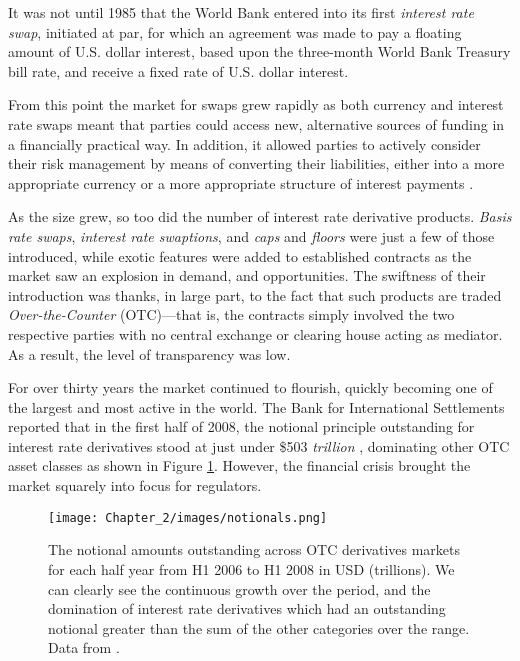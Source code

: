 It was not until 1985 that the World Bank entered into its first \textit{interest rate swap}, initiated at par, for which an agreement was made to pay a floating amount of U.S. dollar interest, based upon the three-month World Bank Treasury bill rate, and receive a fixed rate of U.S. dollar interest.

From this point the market for swaps grew rapidly as both currency and interest rate swaps meant that parties could access new, alternative sources of funding in a financially practical way. In addition, it allowed parties to actively consider their risk management by means of converting their liabilities, either into a more appropriate currency or a more appropriate structure of interest payments \citep{WorldBank_Ch2_1}.

As the size grew, so too did the number of interest rate derivative products. \textit{Basis rate swaps}, \textit{interest rate swaptions}, and \textit{caps} and \textit{floors} were just a few of those introduced, while exotic features were added to established contracts as the market saw an explosion in demand, and opportunities. The swiftness of their introduction was thanks, in large part, to the fact that such products are traded \textit{Over-the-Counter} (OTC)––that is, the contracts simply involved the two respective parties with no central exchange or clearing house acting as mediator. As a result, the level of transparency was low. 

For over thirty years the market continued to flourish, quickly becoming one of the largest and most active in the world. The Bank for International Settlements reported that in the first half of 2008, the notional principle outstanding for interest rate derivatives stood at just under \$503 \textit{trillion} \citep{BIS_Ch2_1}, dominating other OTC asset classes as shown in Figure \ref{fig:notionals}. However, the financial crisis brought the market squarely into focus for regulators. 

\begin{figure}[ht]
\begin{center}
\texttt{[image: Chapter\_2/images/notionals.png]}
\caption[OTC Derivatives Notional Outstanding USD (Trillions)]{The notional amounts outstanding across OTC derivatives markets for each half year from H1 2006 to H1 2008 in USD (trillions). We can clearly see the continuous growth over the period, and the domination of interest rate derivatives which had an outstanding notional greater than the sum of the other categories over the range. Data from \citep{BIS_Ch2_1}.}
\label{fig:notionals}
\end{center}
\end{figure}

